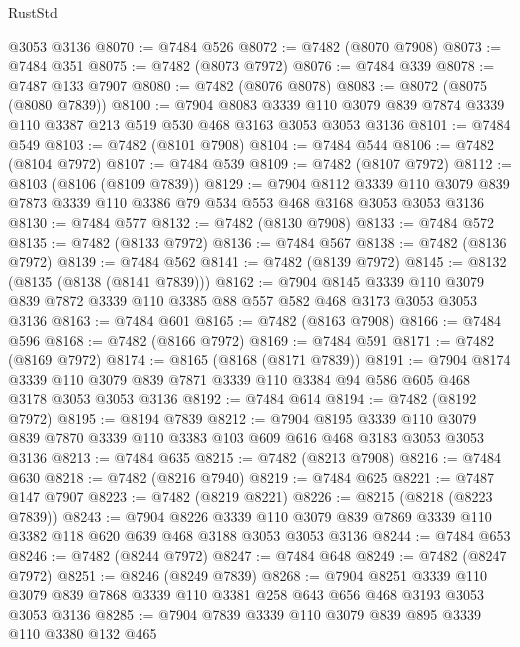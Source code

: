 \begin{lexlean}{RustStd}
\begin{coremodule}
{\begin{coremodule}
{{{{{{{{{{{{{{{{{{{{{{{{{{{{{{{{    @3053
    @3136
@8070 := @7484 @526
@8072 := @7482 (@8070 @7908)
@8073 := @7484 @351
@8075 := @7482 (@8073 @7972)
@8076 := @7484 @339
@8078 := @7487 @133 @7907
@8080 := @7482 (@8076 @8078)
@8083 := @8072 (@8075 (@8080 @7839))
@8100 := @7904
    @8083
    @3339
    @110
    @3079
    @839
    @7874
    @3339
    @110
    @3387
    @213
    @519
    @530
    @468
    @3163
    @3053
    @3053
    @3136
@8101 := @7484 @549
@8103 := @7482 (@8101 @7908)
@8104 := @7484 @544
@8106 := @7482 (@8104 @7972)
@8107 := @7484 @539
@8109 := @7482 (@8107 @7972)
@8112 := @8103 (@8106 (@8109 @7839))
@8129 := @7904
    @8112
    @3339
    @110
    @3079
    @839
    @7873
    @3339
    @110
    @3386
    @79
    @534
    @553
    @468
    @3168
    @3053
    @3053
    @3136
@8130 := @7484 @577
@8132 := @7482 (@8130 @7908)
@8133 := @7484 @572
@8135 := @7482 (@8133 @7972)
@8136 := @7484 @567
@8138 := @7482 (@8136 @7972)
@8139 := @7484 @562
@8141 := @7482 (@8139 @7972)
@8145 := @8132 (@8135 (@8138 (@8141 @7839)))
@8162 := @7904
    @8145
    @3339
    @110
    @3079
    @839
    @7872
    @3339
    @110
    @3385
    @88
    @557
    @582
    @468
    @3173
    @3053
    @3053
    @3136
@8163 := @7484 @601
@8165 := @7482 (@8163 @7908)
@8166 := @7484 @596
@8168 := @7482 (@8166 @7972)
@8169 := @7484 @591
@8171 := @7482 (@8169 @7972)
@8174 := @8165 (@8168 (@8171 @7839))
@8191 := @7904
    @8174
    @3339
    @110
    @3079
    @839
    @7871
    @3339
    @110
    @3384
    @94
    @586
    @605
    @468
    @3178
    @3053
    @3053
    @3136
@8192 := @7484 @614
@8194 := @7482 (@8192 @7972)
@8195 := @8194 @7839
@8212 := @7904
    @8195
    @3339
    @110
    @3079
    @839
    @7870
    @3339
    @110
    @3383
    @103
    @609
    @616
    @468
    @3183
    @3053
    @3053
    @3136
@8213 := @7484 @635
@8215 := @7482 (@8213 @7908)
@8216 := @7484 @630
@8218 := @7482 (@8216 @7940)
@8219 := @7484 @625
@8221 := @7487 @147 @7907
@8223 := @7482 (@8219 @8221)
@8226 := @8215 (@8218 (@8223 @7839))
@8243 := @7904
    @8226
    @3339
    @110
    @3079
    @839
    @7869
    @3339
    @110
    @3382
    @118
    @620
    @639
    @468
    @3188
    @3053
    @3053
    @3136
@8244 := @7484 @653
@8246 := @7482 (@8244 @7972)
@8247 := @7484 @648
@8249 := @7482 (@8247 @7972)
@8251 := @8246 (@8249 @7839)
@8268 := @7904
    @8251
    @3339
    @110
    @3079
    @839
    @7868
    @3339
    @110
    @3381
    @258
    @643
    @656
    @468
    @3193
    @3053
    @3053
    @3136
@8285 := @7904
    @7839
    @3339
    @110
    @3079
    @839
    @895
    @3339
    @110
    @3380
    @132
    @465
}}}}}}}}}}}}}}}}}}}}}}}}}}}}}}}}
\end{coremodule}}
\end{coremodule}
\end{lexlean}
